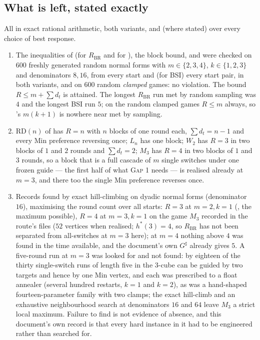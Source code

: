 \subsection{What is left, stated exactly}

\begin{remark}\label{bsc:measured}
All in exact rational arithmetic, both variants, and (where stated) over every
choice of best response.
\begin{enumerate}
\item[(i)] The inequalities of  (for $R_{\mathrm{BR}}$ and
 for ), the block bound,  and 
 were checked on $600$ freshly generated random normal forms with
 $m\in\{2,3,4\}$, $k\in\{1,2,3\}$ and denominators $8,16$, from every start
 and (for BSI) every start pair, in both variants, and on $600$ random
 \emph{clamped} games: no violation.  The bound $R\le m+\sum d_t$ is attained.
 The longest $R_{\mathrm{BR}}$ run met by random sampling was $4$ and the
 longest BSI run $5$; on the random clamped games $R\le m$ always, so
 's $m(k+1)$ is nowhere near met by sampling.
\item[(ii)] $\mathrm{RD}(n)$ of  has $R=n$ with $n$
 blocks of one round each, $\sum d_t=n-1$ and every Min preference reversing
 once; $L_n$ has one block; $W_2$ has $R=3$ in two blocks of $1$ and $2$
 rounds and $\sum d_t=2$; $M_3$ has $R=4$ in two blocks of $1$ and $3$ rounds,
 so a block that is a full cascade of $m$ single switches under one frozen
 guide --- the first half of what \textsc{Gap 1} needs --- is realised
 already at $m=3$, and there too the single Min preference reverses once.
\item[(iii)] Records found by exact hill-climbing on dyadic normal forms
 (denominator $16$), maximising the round count over all starts: $R=3$ at
 $m=2,k=1$ (, the maximum possible), $R=4$ at $m=3,k=1$ on the
 game $M_3$ recorded in the route's files ($52$ vertices when realised;
 $h^{\ast}(3)=4$, so $R_{\mathrm{BR}}$ has not been separated from
 all-switches at $m=3$ here); at $m=4$ nothing above $4$ was found in the
 time available, and the document's own $G^{\sharp}$ already gives $5$.  A
 five-round run at $m=3$ was looked for and not found: by 
 eighteen of the thirty single-switch runs of length five in the $3$-cube can
 be guided by two targets and hence by one Min vertex, and each was prescribed
 to a float annealer (several hundred restarts, $k=1$ and $k=2$), as was a
 hand-shaped fourteen-parameter family with two clamps; the exact hill-climb
 and an exhaustive neighbourhood search at denominators $16$ and $64$ leave
 $M_3$ a strict local maximum.  Failure to find is not evidence of absence,
 and this document's own record is that every hard instance in it had to be
 engineered rather than searched for.
\end{enumerate}
\end{remark}

